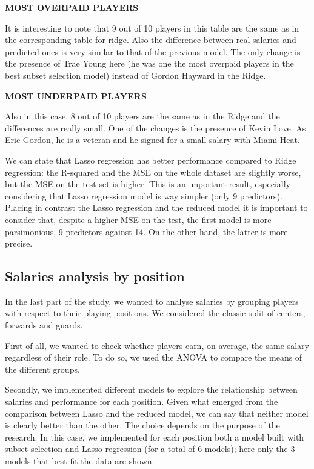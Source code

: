 \documentclass[
]{article}
\begin{document}
\textbf{MOST OVERPAID PLAYERS}

It is interesting to note that 9 out of 10 players in this table are the
same as in the corresponding table for ridge. Also the difference
between real salaries and predicted ones is very similar to that of the
previous model. The only change is the presence of Trae Young here (he
was one the most overpaid players in the best subset selection model)
instead of Gordon Hayward in the Ridge.

\textbf{MOST UNDERPAID PLAYERS}

Also in this case, 8 out of 10 players are the same as in the Ridge and
the differences are really small. One of the changes is the presence of
Kevin Love. As Eric Gordon, he is a veteran and he signed for a small
salary with Miami Heat.

We can state that Lasso regression has better performance compared to
Ridge regression: the R-squared and the MSE on the whole dataset are
slightly worse, but the MSE on the test set is higher. This is an
important result, especially considering that Lasso regression model is
way simpler (only 9 predictors). Placing in contrast the Lasso
regression and the reduced model it is important to consider that,
despite a higher MSE on the test, the first model is more parsimonious,
9 predictors against 14. On the other hand, the latter is more precise.

\hypertarget{salaries-analysis-by-position}{%
\subsection{Salaries analysis by
position}\label{salaries-analysis-by-position}}

In the last part of the study, we wanted to analyse salaries by grouping
players with respect to their playing positions. We considered the
classic split of centers, forwards and guards.

First of all, we wanted to check whether players earn, on average, the
same salary regardless of their role. To do so, we used the ANOVA to
compare the means of the different groups.

Secondly, we implemented different models to explore the relationship
between salaries and performance for each position. Given what emerged
from the comparison between Lasso and the reduced model, we can say that
neither model is clearly better than the other. The choice depends on
the purpose of the research. In this case, we implemented for each
position both a model built with subset selection and Lasso regression
(for a total of 6 models); here only the 3 models that best fit the data
are shown.
\end{document}
